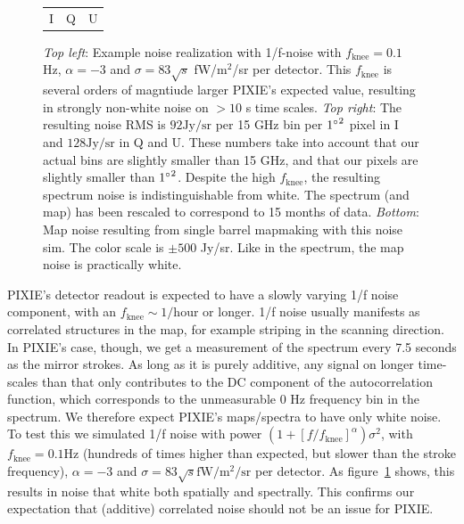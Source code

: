 \documentclass{article}
\begin{document}
\begin{figure}
\begin{tabular}{m{56mm}m{54.4mm}m{56mm}}
		\hspace{32mm}I & \hspace{32mm}Q & \hspace{32mm}U
	\end{tabular}
	\caption{\emph{Top left}: Example noise realization with 1/f-noise with
		$f_\textrm{knee} = 0.1$ Hz, $\alpha=-3$ and $\sigma = 83 \sqrt{s}$
		fW/$\textrm{m}^2$/sr per detector. This $f_\textrm{knee}$ is
		several orders of magntiude larger PIXIE's expected value,
		resulting in strongly non-white noise on $>10$ s time scales.
		\emph{Top right}: The resulting noise RMS is $92 \textrm{Jy/sr}$ per 15 GHz
		bin per ${1\degree}^2$ pixel in I and $128 \textrm{Jy/sr}$ in Q and U. These
		numbers take into account that our actual bins are slightly smaller than
		15 GHz, and that our pixels are slightly smaller than ${1\degree}^2$.
		Despite the high $f_\textrm{knee}$, the resulting spectrum noise is
		indistinguishable from white. The spectrum (and map) has been
		rescaled to correspond to 15 months of data. \emph{Bottom}: Map
		noise resulting from single barrel mapmaking with this noise sim.
		The color scale is $\pm 500$ \textrm{Jy/sr}. Like in the spectrum, the map noise
		is practically white.}
		\label{fig:corrnoise}
\end{figure}
PIXIE's detector readout is expected to have a slowly varying 1/f noise component,
with an $f_\textrm{knee} \sim 1/\textrm{hour}$ or longer. 1/f noise usually manifests as
correlated structures in the map, for example striping in the scanning direction.
In PIXIE's case, though, we get a measurement of the spectrum every 7.5 seconds
as the mirror strokes. As long as it is purely additive, any signal on longer time-scales than that only contributes
to the DC component of the autocorrelation function, which corresponds to the
unmeasurable 0 Hz frequency bin in the spectrum. We therefore expect PIXIE's
maps/spectra to have only white noise. To test this we simulated 1/f noise with
power $(1+[f/f_\textrm{knee}]^\alpha)\sigma^2$, with $f_\textrm{knee} = 0.1 \textrm{Hz}$
(hundreds of times higher than expected, but slower than the stroke frequency),
$\alpha=-3$ and $\sigma = 83\sqrt{s} \textrm{fW}/\textrm{m}^2/\textrm{sr}$ per detector.
As figure~\ref{fig:corrnoise} shows, this results in noise that white both
spatially and spectrally. This confirms our expectation that (additive) correlated
noise should not be an issue for PIXIE.
\end{document}
